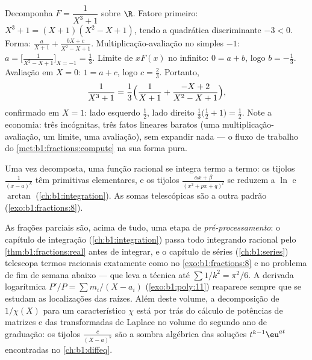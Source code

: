 \begin{example}\label{ex:b1:fractions:cubic}
Decomponha $F = \dfrac{1}{X^3 + 1}$ sobre $\R$. Fatore primeiro: $X^3 +
1 = (X + 1)(X^2 - X + 1)$, tendo a quadrática discriminante $-3 <
0$. Forma: $\frac{a}{X+1} + \frac{bX + c}{X^2 - X + 1}$. Multiplicação-avaliação
no  simples $-1$: $a = \bigl[\frac1{X^2 - X +
1}\bigr]_{X=-1} = \frac13$. Limite de $xF(x)$ no infinito: $0 = a +
b$, logo $b = -\frac13$. Avaliação em $X = 0$: $1 = a + c$, logo $c =
\frac23$. Portanto,
\[
\frac{1}{X^3+1} = \frac13\Bigl(\frac{1}{X+1}
+ \frac{-X + 2}{X^2 - X + 1}\Bigr) ,
\]
confirmado em $X = 1$: lado esquerdo $\frac12$, lado direito
$\frac13\bigl(\frac12 + 1\bigr) = \frac12$. Note a economia:
três incógnitas, três fatos lineares baratos (uma
multiplicação-avaliação, um limite, uma avaliação), sem expandir nada
--- o fluxo de trabalho do \cref{met:b1:fractions:compute} na sua forma pura.
\end{example}

\begin{remark}
Uma vez decomposta, uma função racional se integra termo a termo: os
tijolos $\frac{1}{(x-a)^k}$ têm primitivas elementares, e os tijolos
$\frac{\alpha x + \beta}{(x^2 + px + q)^l}$ se reduzem a $\ln$ e
$\arctan$ (\cref{ch:b1:integration}). As somas telescópicas são a outra
 padrão (\cref{exo:b1:fractions:8}).
\end{remark}

\begin{remark}\label{rem:b1:fractions:whereused}
As frações parciais são, acima de tudo, uma etapa de
\emph{pré-processamento}: o capítulo de integração (\cref{ch:b1:integration})
passa todo integrando racional pelo \cref{thm:b1:fractions:real} antes de
integrar, e o capítulo de séries (\cref{ch:b1:series}) telescopa termos
racionais exatamente como no \cref{exo:b1:fractions:8} e no problema de fim
de semana abaixo --- que leva a técnica até
$\sum 1/k^2 = \pi^2/6$. A derivada logarítmica $P'/P = \sum
m_i/(X - a_i)$ (\cref{exo:b1:poly:11}) reaparece sempre que se estudam as
localizações das raízes. Além deste volume, a decomposição de
$1/\chi(X)$ para um  característico $\chi$ está por trás do
cálculo de potências de matrizes e das transformadas de Laplace no
volume do segundo ano de graduação: os tijolos $\frac{c}{(X - a)^k}$ são a sombra
algébrica das soluções $t^{k-1}\eu^{at}$ encontradas no \cref{ch:b1:diffeq}.
\end{remark}


